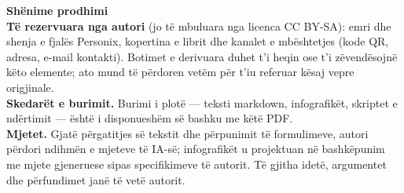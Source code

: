 \clearpage
\thispagestyle{empty}
\begin{flushleft}\small\sffamily
\textbf{Shënime prodhimi}\\[1.2em]

\textbf{Të rezervuara nga autori} (jo të mbuluara nga licenca CC BY-SA): emri
dhe shenja e fjalës Personix, kopertina e librit dhe kanalet e mbështetjes (kode
QR, adresa, e-mail kontakti). Botimet e derivuara duhet t'i heqin ose t'i
zëvendësojnë këto elemente; ato mund të përdoren vetëm për t'iu referuar kësaj
vepre origjinale.\\[1.2em]

\textbf{Skedarët e burimit.} Burimi i plotë --- teksti markdown, infografikët,
skriptet e ndërtimit --- është i disponueshëm së bashku me këtë PDF.\\[1.2em]

\textbf{Mjetet.} Gjatë përgatitjes së tekstit dhe përpunimit të formulimeve,
autori përdori ndihmën e mjeteve të IA-së; infografikët u projektuan në
bashkëpunim me mjete gjeneruese sipas specifikimeve të autorit.
Të gjitha idetë, argumentet dhe përfundimet janë të vetë autorit.
\end{flushleft}
\clearpage

